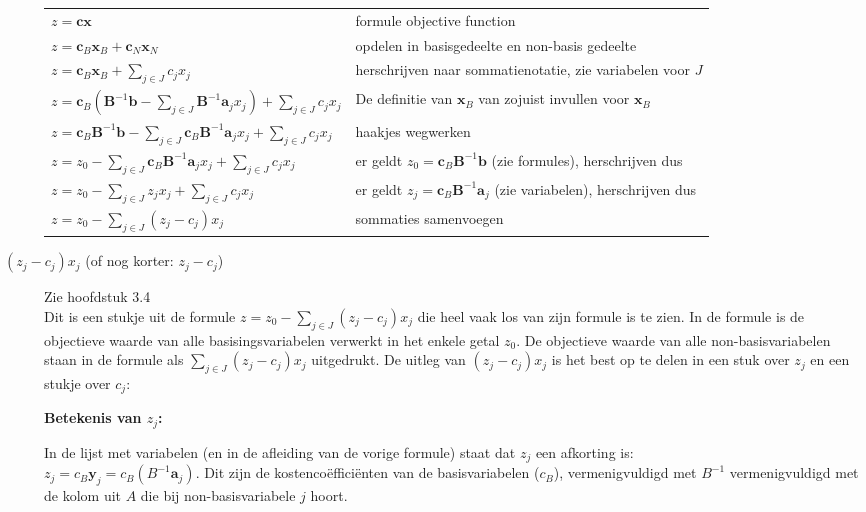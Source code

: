 \documentclass[10pt,a4paper]{article}
\begin{document}
\begin{description}
\begin{tabular}{l l}
$z = \textbf{cx}$ & formule objective function \\
$z = \textbf{c}_B \textbf{x}_B + \textbf{c}_N \textbf{x}_N$ & opdelen in basisgedeelte en non-basis gedeelte \\
$z = \textbf{c}_B \textbf{x}_B + \displaystyle\sum\limits_{j \in J}c_j x_j$ & herschrijven naar sommatienotatie, zie variabelen voor $J$ \\
$z = \textbf{c}_B (\textbf{B}^{-1}\textbf{b} - \displaystyle\sum\limits_{j \in J}\textbf{B}^ {-1}\textbf{a}_j x_j) + \displaystyle\sum\limits_{j \in J}c_j x_j$ & De definitie van $\textbf{x}_B$ van zojuist invullen voor $\textbf{x}_B$ \\
$z = \textbf{c}_B \textbf{B}^{-1}\textbf{b} - \displaystyle\sum\limits_{j \in J}\textbf{c}_B \textbf{B}^ {-1}\textbf{a}_j x_j + \displaystyle\sum\limits_{j \in J}c_j x_j$ & haakjes wegwerken \\
$z = z_0 - \displaystyle\sum\limits_{j \in J}\textbf{c}_B \textbf{B}^ {-1}\textbf{a}_j x_j + \displaystyle\sum\limits_{j \in J}c_j x_j$ & er geldt $z_0 = \textbf{c}_B\textbf{B}^{-1}\textbf{b}$ (zie formules), herschrijven dus \\
$z = z_0 - \displaystyle\sum\limits_{j \in J}z_j x_j + \displaystyle\sum\limits_{j \in J}c_j x_j$ & er geldt $z_j = \textbf{c}_B \textbf{B}^ {-1}\textbf{a}_j$ (zie variabelen), herschrijven dus \\
$z = z_0 - \displaystyle\sum\limits_{j \in J}(z_j - c_j) x_j$ & sommaties samenvoegen \\
\end{tabular}



\item[$(z_j - c_j)x_j$ (of nog korter: $z_j - c_j$)] \hfill Zie hoofdstuk 3.4 \\
Dit is een stukje uit de formule $z = z_0 - \displaystyle\sum\limits_{j \in J} (z_j - c_j)x_j$ die heel vaak los van zijn formule is te zien. In de formule is de objectieve waarde van alle basisingsvariabelen verwerkt in het enkele getal $z_0$. De objectieve waarde van alle non-basisvariabelen staan in de formule als $\displaystyle\sum\limits_{j \in J} (z_j - c_j)x_j$ uitgedrukt. De uitleg van $(z_j - c_j)x_j$ is het best op te delen in een stuk over $z_j$ en een stukje over $c_j$:

\textbf{Betekenis van $z_j$:}


In de lijst met variabelen (en in de afleiding van de vorige formule) staat dat $z_j$ een afkorting is: \\
$z_j = c_B \textbf{y}_j = c_B(B^{-1}\textbf{a}_j)$. Dit zijn de kostencoëfficiënten van de basisvariabelen ($c_B$), vermenigvuldigd met $B^{-1}$ vermenigvuldigd met de kolom uit $A$ die bij non-basisvariabele $j$ hoort.


\end{description}
\end{document}
